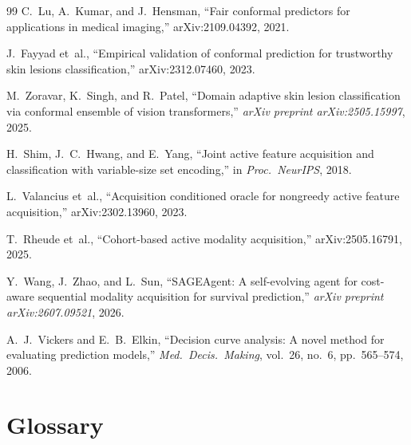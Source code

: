 \documentclass[conference]{IEEEtran}
\newcommand{\1}{\mathbf{1}}
\begin{document}
\begin{thebibliography}{99}
C.~Lu, A.~Kumar, and J.~Hensman,
``Fair conformal predictors for applications in medical imaging,''
arXiv:2109.04392, 2021.

J.~Fayyad et~al.,
``Empirical validation of conformal prediction for trustworthy skin
lesions classification,''
arXiv:2312.07460, 2023.

M.~Zoravar, K.~Singh, and R.~Patel,
``Domain adaptive skin lesion classification via conformal ensemble
of vision transformers,''
\emph{arXiv preprint arXiv:2505.15997}, 2025.

H.~Shim, J.~C.~Hwang, and E.~Yang,
``Joint active feature acquisition and classification with variable-size
set encoding,''
in \emph{Proc.\ NeurIPS}, 2018.

L.~Valancius et~al.,
``Acquisition conditioned oracle for nongreedy active feature acquisition,''
arXiv:2302.13960, 2023.

T.~Rheude et~al.,
``Cohort-based active modality acquisition,''
arXiv:2505.16791, 2025.

Y.~Wang, J.~Zhao, and L.~Sun,
``SAGEAgent: A self-evolving agent for cost-aware sequential modality acquisition for survival prediction,''
\emph{arXiv preprint arXiv:2607.09521}, 2026.

A.~J.~Vickers and E.~B.~Elkin,
``Decision curve analysis: A novel method for evaluating prediction models,''
\emph{Med.\ Decis.\ Making}, vol.~26, no.~6, pp.~565--574, 2006.

\end{thebibliography}

\appendix

\section{Glossary}
\label{app:glossary}
\end{document}
